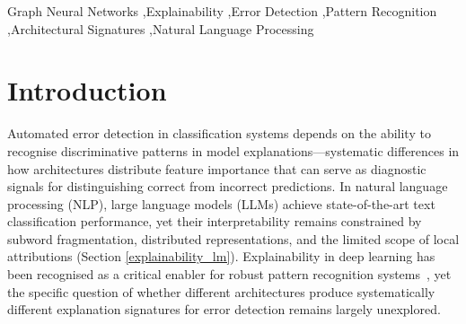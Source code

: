 \documentclass[preprint, times, review, 10pt]{elsarticle}
\begin{document}
\begin{frontmatter}
\begin{abstract}
We demonstrate that hierarchical graph-based architectures produce substantially sharper discriminative patterns (99.7--100.0\% error detection accuracy) compared to token-based architectures (88.1--89.6\% accuracy) under fair comparison. This performance gap persists across datasets, graph topologies, and prediction correctness conditions. Integrated logistic regression analysis reveals that all architectures rely on necessity-based features, but hierarchical discrete structures produce significantly stronger necessity signals through binary node participation, while continuous token embeddings produce attenuated signals through distributed compensatory pathways.

For high-stakes applications requiring transparent automated error detection, hierarchical graph-based explainability patterns offer clear advantages over token-based approaches. Our four-dimensional evaluation framework provides a reproducible methodology for architectural signature analysis in explainability research.
\end{abstract}



\begin{keyword}
Graph Neural Networks \sep Explainability \sep Error Detection \sep Pattern Recognition \sep Architectural Signatures \sep Natural Language Processing
\end{keyword}

\end{frontmatter}





\section{Introduction}\label{Introduction}
Automated error detection in classification systems depends on the ability to recognise discriminative patterns in model explanations—systematic differences in how architectures distribute feature importance that can serve as diagnostic signals for distinguishing correct from incorrect predictions. In natural language processing (NLP), large language models (LLMs) achieve state-of-the-art text classification performance, yet their interpretability remains constrained by subword fragmentation, distributed representations, and the limited scope of local attributions (Section \ref{explainability_lm}). Explainability in deep learning has been recognised as a critical enabler for robust pattern recognition systems~\cite{bai2021explainable}, yet the specific question of whether different architectures produce systematically different explanation signatures for error detection remains largely unexplored.
\end{document}
